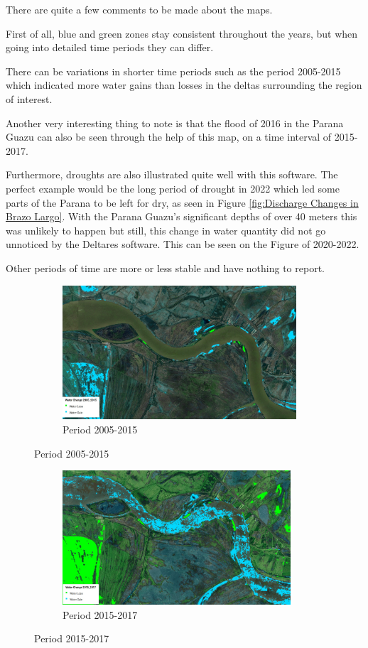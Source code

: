 There are quite a few comments to be made about the maps. 

First of all, blue and green zones stay consistent throughout the years, but when going into detailed time periods they can differ.

There can be variations in shorter time periods such as the period 2005-2015 which indicated more water gains than losses in the deltas surrounding the region of interest.

Another very interesting thing to note is that the flood of 2016 in the Parana Guazu can also be seen through the help of this map, on a time interval of 2015-2017.

Furthermore, droughts are also illustrated quite well with this software. The perfect example would be the long period of drought in 2022 which led some parts of the Parana to be left for dry, as seen in Figure \ref{fig:Discharge Changes in Brazo Largo}. With the Parana Guazu's significant depths of over 40 meters this was unlikely to happen but still, this change in water quantity did not go unnoticed by the Deltares software. This can be seen on the Figure of 2020-2022.

Other periods of time are more or less stable and have nothing to report.

\begin{figure}[H]
    \centering
    \begin{subfigure}[a]{0.6\textwidth}
        \includegraphics[width=\linewidth, height=5cm]{figures/ch5/2005-2015.jpg}
        \caption{Period 2005-2015}
        \label{fig:sontek}
    \end{subfigure}
\end{figure}

\begin{figure}[H]
    \centering
    \begin{subfigure}[b]{0.6\textwidth}
        \includegraphics[width=\linewidth, height=5cm]{figures/ch5/2015-2017.jpg}
        \caption{Period 2015-2017}
        \label{fig:sontek}
    \end{subfigure}
\end{figure}

